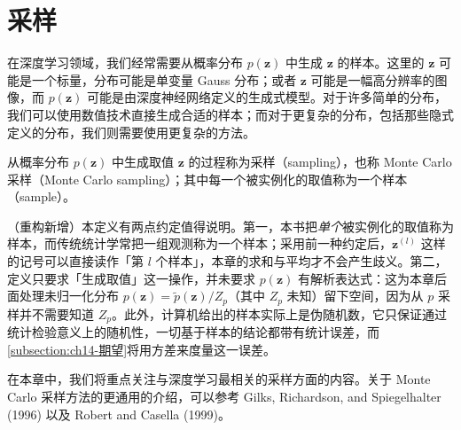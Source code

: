 \documentclass[../main.tex]{subfiles}
\begin{document}
\chapter{采样}\label{chapter:ch14-采样}

在深度学习领域，我们经常需要从概率分布 $p(\bm{z})$ 中生成 $\bm{z}$ 的样本。这里的 $\bm{z}$ 可能是一个标量，分布可能是单变量 Gauss 分布；或者 $\bm{z}$ 可能是一幅高分辨率的图像，而 $p(\bm{z})$ 可能是由深度神经网络定义的生成式模型。对于许多简单的分布，我们可以使用数值技术直接生成合适的样本；而对于更复杂的分布，包括那些隐式定义的分布，我们则需要使用更复杂的方法。

\begin{definition}[采样与样本]\label{definition:ch14-采样}
从概率分布 $p(\bm{z})$ 中生成取值 $\bm{z}$ 的过程称为采样（sampling），也称 Monte Carlo 采样（Monte Carlo sampling）；其中每一个被实例化的取值称为一个样本（sample）。
\end{definition}

\begin{remark}（重构新增）本定义有两点约定值得说明。第一，本书把\emph{单个}被实例化的取值称为样本，而传统统计学常把一组观测称为一个样本；采用前一种约定后，$\bm{z}^{(l)}$ 这样的记号可以直接读作「第 $l$ 个样本」，本章的求和与平均才不会产生歧义。第二，定义只要求「生成取值」这一操作，并未要求 $p(\bm{z})$ 有解析表达式：这为本章后面处理未归一化分布 $p(\bm{z})=\widetilde{p}(\bm{z})/Z_p$（其中 $Z_p$ 未知）留下空间，因为从 $p$ 采样并不需要知道 $Z_p$。此外，计算机给出的样本实际上是伪随机数，它只保证通过统计检验意义上的随机性，一切基于样本的结论都带有统计误差，而\cref{subsection:ch14-期望}将用方差来度量这一误差。
\end{remark}

在本章中，我们将重点关注与深度学习最相关的采样方面的内容。关于 Monte Carlo 采样方法的更通用的介绍，可以参考 Gilks, Richardson, and Spiegelhalter (1996) 以及 Robert and Casella (1999)。





\end{document}
